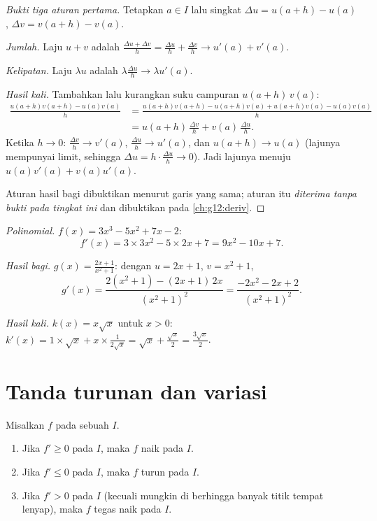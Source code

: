 \begin{proof}[Bukti tiga aturan pertama]
Tetapkan $a \in I$ lalu singkat $\Delta u = u(a+h) - u(a)$,
$\Delta v = v(a+h) - v(a)$.

\emph{Jumlah.} Laju $u + v$ adalah
$\frac{\Delta u + \Delta v}{h} = \frac{\Delta u}{h} + \frac{\Delta v}{h}
\to u'(a) + v'(a)$.

\emph{Kelipatan.} Laju $\lambda u$ adalah
$\lambda \frac{\Delta u}{h} \to \lambda u'(a)$.

\emph{Hasil kali.} Tambahkan lalu kurangkan suku campuran $u(a+h)\,v(a)$:
\begin{align*}
\frac{u(a+h)v(a+h) - u(a)v(a)}{h}
&= \frac{u(a+h)v(a+h) - u(a+h)v(a) + u(a+h)v(a) - u(a)v(a)}{h}\\
&= u(a+h)\,\frac{\Delta v}{h} + v(a)\,\frac{\Delta u}{h}.
\end{align*}
Ketika $h \to 0$: $\frac{\Delta v}{h} \to v'(a)$, $\frac{\Delta u}{h} \to
u'(a)$, dan $u(a+h) \to u(a)$ (lajunya mempunyai limit, sehingga
$\Delta u = h \cdot \frac{\Delta u}{h} \to 0$). Jadi lajunya menuju
$u(a)v'(a) + v(a)u'(a)$.

Aturan hasil bagi dibuktikan menurut garis yang sama; aturan itu
\emph{diterima tanpa bukti pada tingkat ini} dan dibuktikan pada \cref{ch:g12:deriv}.
\end{proof}

\begin{example}\label{ex:g11:deriv:computations}
\emph{Polinomial.} $f(x) = 3x^3 - 5x^2 + 7x - 2$:
\[
f'(x) = 3 \times 3x^2 - 5 \times 2x + 7 = 9x^2 - 10x + 7 .
\]

\emph{Hasil bagi.} $g(x) = \frac{2x+1}{x^2+1}$: dengan $u = 2x + 1$, $v = x^2
+ 1$,
\[
g'(x) = \frac{2(x^2+1) - (2x+1)\,2x}{(x^2+1)^2}
= \frac{-2x^2 - 2x + 2}{(x^2+1)^2}.
\]

\emph{Hasil kali.} $k(x) = x\sqrt x$ untuk $x > 0$:
$k'(x) = 1 \times \sqrt x + x \times \frac{1}{2\sqrt x}
= \sqrt x + \frac{\sqrt x}{2} = \frac{3\sqrt x}{2}$.
\end{example}

\section{Tanda turunan dan variasi}

\begin{theorem}\label{thm:g11:deriv:variations}
Misalkan $f$  pada sebuah  $I$.
\begin{enumerate}
  \item Jika $f' \geq 0$ pada $I$, maka $f$ naik pada $I$.
  \item Jika $f' \leq 0$ pada $I$, maka $f$ turun pada $I$.
  \item Jika $f' > 0$ pada $I$ (kecuali mungkin di berhingga banyak titik
        tempat  lenyap), maka $f$ tegas naik pada $I$.
\end{enumerate}
\end{theorem}

